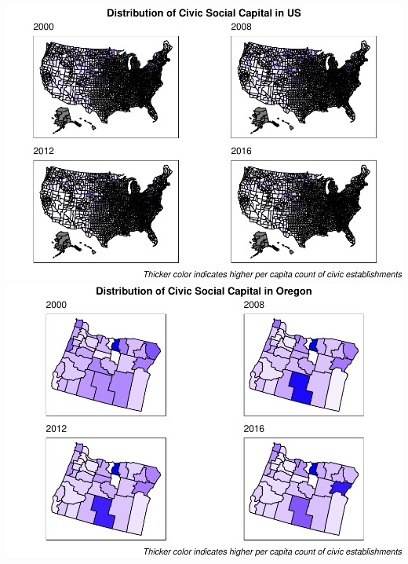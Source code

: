 \documentclass[
  english,
  man]{apa6}
\begin{document}
\includegraphics{Script_files/figure-latex/visualization civic social capital maps-1.pdf} \includegraphics{Script_files/figure-latex/visualization civic social capital maps-2.pdf}
\end{document}
